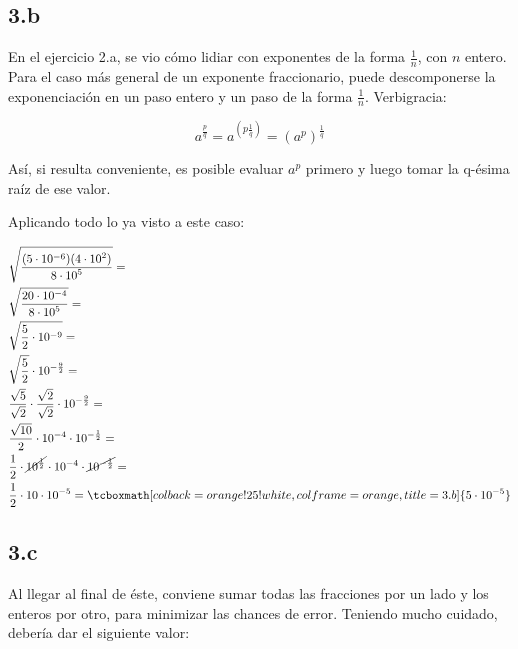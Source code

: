\documentclass{article}
\newcommand{\hresult}[2]{\tcboxmath[colback=orange!25!white,colframe=orange, title=#1] {#2} }
\begin{document}
\subsection*{3.b}
\label{subsec:3.b}

En el ejercicio 2.a, se vio cómo lidiar con exponentes de la forma $\frac{1}{n}$, con $n$ entero. Para el caso más general de un exponente fraccionario, puede descomponerse la exponenciación en un paso entero y un paso de la forma $\frac{1}{n}$. Verbigracia:

\begin{equation}
a^{\frac{p}{q}} = a^{(p \frac{1}{q})} = (a^p)^{\frac{1}{q}}
\end{equation}

Así, si resulta conveniente, es posible evaluar $a^p$ primero y luego tomar la q-ésima raíz de ese valor.

Aplicando todo lo ya visto a este caso:

\begin{subequations}
\begin{align}
& \sqrt{ \frac{ (5 \cdot 10^{-6}) (4 \cdot {10}^2) }{8 \cdot {10}^5} } = \\
& \sqrt{ \frac{ 20 \cdot 10^{-4} }{8 \cdot {10}^5} } = \\
& \sqrt{ \frac{5}{2} \cdot 10^{-9} } = \\
& \sqrt{ \frac{5}{2} } \cdot 10^{-\frac{9}{2}} = \\
& \frac{\sqrt{5}}{\sqrt{2}} \cdot \frac{\sqrt{2}}{\sqrt{2}} \cdot 10^{-\frac{9}{2}} = \\
& \frac{\sqrt{10}}{2} \cdot 10^{-4} \cdot 10^{-\frac{1}{2}} = \\
& \frac{1}{2} \cdot \cancel{10^{\frac{1}{2}}} \cdot 10^{-4} \cdot \cancel{10^{-\frac{1}{2}}} = \\
& \frac{1}{2} \cdot 10 \cdot 10^{-5} = \hresult{3.b} { 5 \cdot 10^{-5} }
\end{align}
\end{subequations}

\subsection*{3.c}
\label{subsec:3.c}

Al llegar al final de éste, conviene sumar todas las fracciones por un lado y los enteros por otro, para minimizar las chances de error. Teniendo mucho cuidado, debería dar el siguiente valor:
\end{document}
